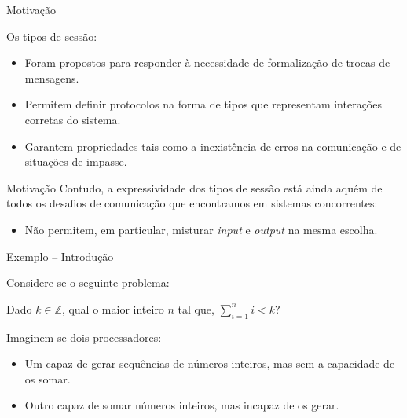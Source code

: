 \lstset{language=freest, numbers=none, escapeinside=||}

\begin{frame}[fragile]{Motivação}

  Os tipos de sessão:
  \begin{itemize}
  \item Foram propostos para responder à necessidade de formalização de trocas de mensagens.
    \pause
  \item Permitem definir protocolos na forma de tipos que representam interações corretas do sistema.
    \pause
  \item Garantem propriedades tais como a inexistência de erros na comunicação e de situações de impasse.
  \end{itemize}
\end{frame}

\begin{frame}[fragile]{Motivação}
  Contudo, a expressividade dos tipos de sessão está ainda aquém de todos os desafios de comunicação que encontramos em sistemas concorrentes:
  \vspace{3mm}
  \begin{itemize}
  \item Não permitem, em particular, misturar \textit{input} e \textit{output} na mesma escolha.
  \end{itemize}
\end{frame}

\begin{frame}[fragile]{Exemplo -- Introdução}

  Considere-se o seguinte problema:
  
  Dado $k \in \mathbb{Z}$, qual o maior inteiro $n$ tal que, $\sum_{i=1}^{n} i < k$?
  \pause
  
  Imaginem-se dois processadores:
  \begin{itemize}
  \item Um capaz de gerar sequências de números inteiros, mas sem a capacidade de os somar.
    \pause
  \item Outro capaz de somar números inteiros, mas incapaz de os gerar.
  \end{itemize}  
\end{frame}


